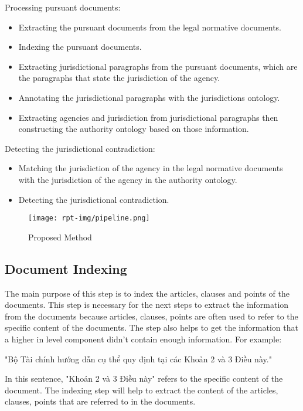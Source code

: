 Processing pursuant documents:
    \begin{itemize}
        \item Extracting the pursuant documents from the legal normative documents.
        \item Indexing the pursuant documents.
        \item Extracting jurisdictional paragraphs from the pursuant documents, which are the paragraphs that state the jurisdiction of the agency.
        \item Annotating the jurisdictional paragraphs with the jurisdictions ontology.
        \item Extracting agencies and jurisdiction from jurisdictional paragraphs then constructing the authority ontology based on those information.
    \end{itemize}

Detecting the jurisdictional contradiction:
    \begin{itemize}
        \item Matching the jurisdiction of the agency in the legal normative documents with the jurisdiction of the agency in the authority ontology.
        \item Detecting the jurisdictional contradiction.
    \end{itemize}

    \begin{figure}[H]
        \centering
        \texttt{[image: rpt-img/pipeline.png]}
        \caption{Proposed Method}
        \label{fig:proposedmethod}
    \end{figure}

\subsection{Document Indexing}

    The main purpose of this step is to index the articles, clauses and points of the documents. This step is necessary for the next steps to extract the information from the documents because articles, clauses, points are often used to refer to the specific content of the documents. The step also helps to get the information that a higher in level component didn't contain enough information. For example:

    "Bộ Tài chính hướng dẫn cụ thể quy định tại các Khoản 2 và 3 Điều này."

    In this sentence, "Khoản 2 và 3 Điều này" refers to the specific content of the document. The indexing step will help to extract the content of the articles, clauses, points that are referred to in the documents.

